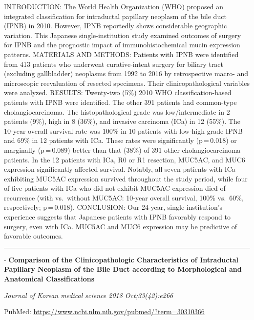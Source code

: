 \documentclass[]{article}
\begin{document}
INTRODUCTION: The World Health Organization (WHO) proposed an integrated
classification for intraductal papillary neoplasm of the bile duct
(IPNB) in 2010. However, IPNB reportedly shows considerable geographic
variation. This Japanese single-institution study examined outcomes of
surgery for IPNB and the prognostic impact of immunohistochemical mucin
expression patterns. MATERIALS AND METHODS: Patients with IPNB were
identified from 413 patients who underwent curative-intent surgery for
biliary tract (excluding gallbladder) neoplasms from 1992 to 2016 by
retrospective macro- and microscopic reevaluation of resected specimens.
Their clinicopathological variables were analyzed. RESULTS: Twenty-two
(5\%) 2010 WHO classification-based patients with IPNB were identified.
The other 391 patients had common-type cholangiocarcinoma. The
histopathological grade was low/intermediate in 2 patients (9\%), high
in 8 (36\%), and invasive carcinoma (ICa) in 12 (55\%). The 10-year
overall survival rate was 100\% in 10 patients with low-high grade IPNB
and 69\% in 12 patients with ICa. These rates were significantly
(p\,=\,0.018) or marginally (p\,=\,0.089) better than that (38\%) of 391
other-cholangiocarcinoma patients. In the 12 patients with ICa, R0 or R1
resection, MUC5AC, and MUC6 expression significantly affected survival.
Notably, all seven patients with ICa exhibiting MUC5AC expression
survived throughout the study period, while four of five patients with
ICa who did not exhibit MUC5AC expression died of recurrence (with
vs.~without MUC5AC: 10-year overall survival, 100\% vs.~60\%,
respectively; p\,=\,0.018). CONCLUSION: Our 24-year, single
institution's experience suggests that Japanese patients with IPNB
favorably respond to surgery, even with ICa. MUC5AC and MUC6 expression
may be predictive of favorable outcomes.

{}

{}

\begin{center}\rule{0.5\linewidth}{\linethickness}\end{center}

 - \textbf{Comparison of the Clinicopathologic Characteristics of
Intraductal Papillary Neoplasm of the Bile Duct according to
Morphological and Anatomical Classifications}

\emph{Journal of Korean medical science 2018 Oct;33(42):e266}

PubMed: \url{https://www.ncbi.nlm.nih.gov/pubmed/?term=30310366}
\end{document}
